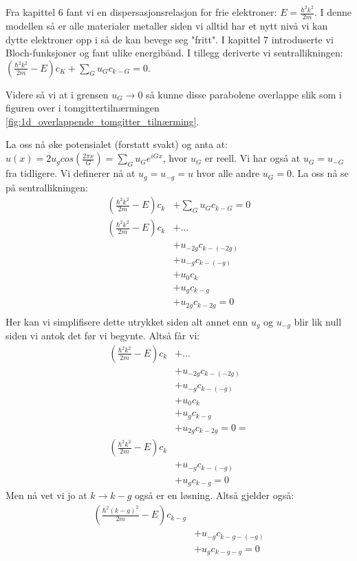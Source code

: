 \documentclass{article}
\begin{document}
Fra kapittel 6 fant vi en dispersasjonsrelasjon for frie elektroner: $E = \frac{\hbar^2 k^2}{2m}$. I denne modellen så er alle materialer metaller siden vi alltid har et nytt nivå vi kan dytte elektroner opp i så de kan bevege seg "fritt". I kapittel 7 introduserte vi Bloch-funksjoner og fant ulike energibånd.
 I tillegg deriverte vi sentrallikningen: $\left(\frac{\hbar^2 k^2}{2m} - E\right) c_K + \sum_G u_G c_{k - G} = 0$. 

Videre så vi at i grensen $u_G \rightarrow 0$ så kunne disse parabolene overlappe slik som i figuren over i tomgittertilnærmingen \ref{fig:1d_overlappende_tomgitter_tilnærming}.

La oss nå øke potensialet (forstatt svakt) og anta at: $u(x) = 2 u_g cos(\frac{2\pi x}{G}) = \sum_G u_G e^{iGx}$, hvor $u_G$ er reell. Vi har også at $u_G = u_{-G}$ fra tidligere. Vi definerer nå at $u_g = u_{-g} = u$ hvor alle andre $u_G=0$. La oss nå se på sentrallikningen:
\begin{align}
  \left(\frac{\hbar^2 k^2}{2m} - E \right)c_k &+ \sum_G u_G c_{k-G} = 0 \\
  \left(\frac{\hbar^2 k^2}{2m} - E \right)c_k  &+ ... \\
  &+ u_{-2g} c_{k - (-2g)} \\
  &+ u_{-g} c_{k - (-g)} \\
  &+ u_{0} c_{k} \\
  &+ u_{g} c_{k - g} \\
  &+ u_{2g} c_{k - 2g}  = 0\\
\end{align}
Her kan vi simplifisere dette utrykket siden alt annet enn $u_g$ og $u_{-g}$ blir lik null siden vi antok det før vi begynte. Altså får vi:
\begin{align}
  \left(\frac{\hbar^2 k^2}{2m} - E \right)c_k  &+ ... \\
  &+ u_{-2g} c_{k - (-2g)} \\
  &+ u_{-g} c_{k - (-g)} \\
  &+ u_{0} c_{k} \\
  &+ u_{g} c_{k - g} \\
  &+ u_{2g} c_{k - 2g}  = 0 = \\
  \left(\frac{\hbar^2 k^2}{2m} - E \right)c_k \\
  &+ u_{-g} c_{k - (-g)} \\
  &+ u_{g} c_{k - g} = 0
\end{align}
Men nå vet vi jo at $k\rightarrow k-g$ også er en løsning. Altså gjelder også:
\begin{align}
  \left(\frac{\hbar^2 (k-g)^2}{2m} - E \right)c_{k-g} \\
  &+ u_{-g} c_{k - g - (-g)} \\
  &+ u_{g} c_{k - g - g} = 0
\end{align}
\end{document}
